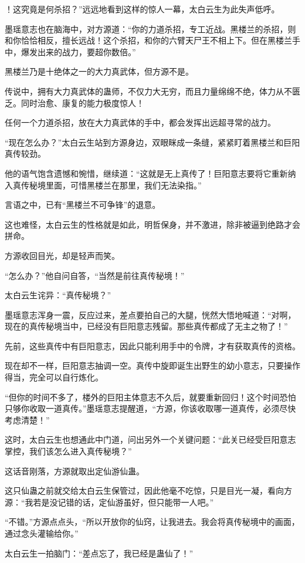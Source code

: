 \begin{this_body}
！这究竟是何杀招？”远远地看到这样的惊人一幕，太白云生为此失声低呼。

墨瑶意志也在脑海中，对方源道：“你的力道杀招，专工近战。黑楼兰的杀招，则和你恰恰相反，擅长远战！这个杀招，和你的六臂天尸王不相上下。但在黑楼兰手中，爆发出来的战力，要超你数倍。”

黑楼兰乃是十绝体之一的大力真武体，但方源不是。

传说中，拥有大力真武体的蛊师，不仅力大无穷，而且力量绵绵不绝，体力从不匮乏。同时治愈、康复的能力极度惊人！

任何一个力道杀招，放在大力真武体的手中，都会发挥出远超寻常的战力。

“现在怎么办？”太白云生站到方源身边，双眼眯成一条缝，紧紧盯着黑楼兰和巨阳真传较劲。

他的语气饱含遗憾和惋惜，继续道：“这就是无上真传了！巨阳意志要将它重新纳入真传秘境里面，可惜黑楼兰在那里，我们无法染指。”

言语之中，已有“黑楼兰不可争锋”的退意。

这也难怪，太白云生的性格就是如此，明哲保身，并不激进，除非被逼到绝路才会拼命。

方源收回目光，却是轻声而笑。

“怎么办？”他自问自答，“当然是前往真传秘境！”

太白云生诧异：“真传秘境？”

墨瑶意志浑身一震，反应过来，差点要拍自己的大腿，恍然大悟地喊道：“对啊，现在的真传秘境当中，已经没有巨阳意志残留。那些真传都成了无主之物了！”

先前，这些真传中有巨阳意志，因此只能利用手中的令牌，才有获取真传的资格。

现在却不一样，巨阳意志抽调一空。真传中旋即诞生出野生的幼小意志，只要操作得当，完全可以自行炼化。

“但你的时间不多了，楼外的巨阳主体意志不久后，就要重新回归！这个时间恐怕只够你收取一道真传。”墨瑶意志提醒道，“方源，你该收取哪一道真传，必须尽快考虑清楚！”

这时，太白云生也想通此中门道，问出另外一个关键问题：“此关已经受巨阳意志掌控，我们该怎么进入真传秘境？”

这话音刚落，方源就取出定仙游仙蛊。

这只仙蛊之前就交给太白云生保管过，因此他毫不吃惊，只是目光一凝，看向方源：“我若是没记错的话，定仙游虽好，但只能带一人吧。”

“不错。”方源点点头，“所以开放你的仙窍，让我进去。我会将真传秘境中的画面，通过念头灌输给你。”

太白云生一拍脑门：“差点忘了，我已经是蛊仙了！”


\end{this_body}
